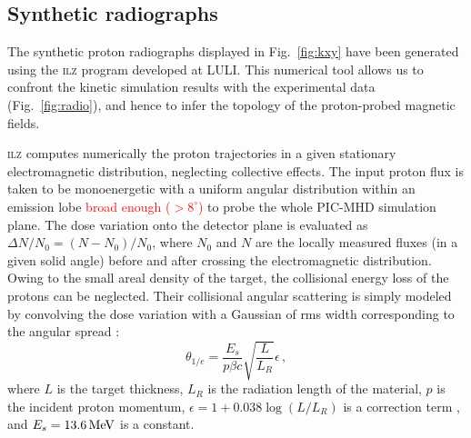 \documentclass[aps,twocolumn,showpacs,superscriptaddress]{revtex4}
\begin{document}
\subsection*{Synthetic radiographs}
The synthetic proton radiographs displayed in Fig.~\ref{fig:kxy} have been generated using the \textsc{ilz} program developed at LULI. This numerical tool allows us to confront the kinetic simulation results with the experimental data (Fig.~\ref{fig:radio}), and hence to infer the topology of the proton-probed magnetic fields.

\textsc{ilz} computes numerically the proton trajectories in a given stationary electromagnetic distribution, neglecting collective effects. 
The input proton flux is taken to be monoenergetic with a uniform angular distribution within an emission lobe \textcolor{red}{broad enough  ($>8^\circ$)} to probe the whole PIC-MHD simulation plane. The dose variation onto the detector plane is evaluated as $\Delta N/N_0= (N-N_0)/N_0$, where $N_0$ and $N$ are the locally measured fluxes (in a given solid angle) before and after crossing the electromagnetic distribution. Owing to the small areal density of the target, the collisional energy loss of the protons can be neglected. Their collisional angular scattering is simply modeled by convolving the dose variation with a Gaussian of rms width corresponding to the angular spread \cite{NIM_Highland_1975}:
\begin{equation}
\theta_{1/e}  = \frac{E_s}{p\beta c} \sqrt{\frac{L}{L_R}} \epsilon \,,
\end{equation}
where $L$ is the target thickness, $L_R$ is the radiation length of the material, $p$ is the incident proton momentum, $\epsilon  = 1 + 0.038 \log\left(L/L_R\right)$ is a correction term \cite{EPJ_Groom_2000}, and $E_s=13.6\,\rm MeV$ is a constant.
\end{document}
